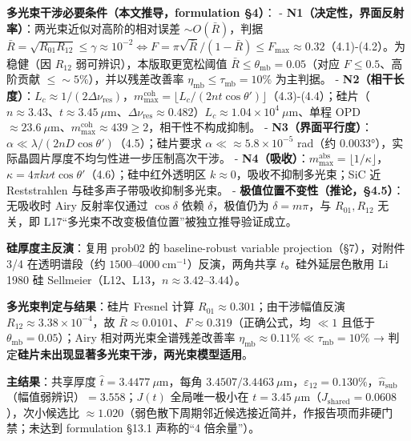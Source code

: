\textbf{多光束干涉必要条件（本文推导，formulation §4）}： -
\textbf{N1（决定性，界面反射率）}：两光束近似对高阶的相对误差
\(\sim O(\bar R)\)，判据
\(\bar R=\sqrt{R_{01}R_{12}}\le\gamma\approx10^{-2}\iff F=\pi\sqrt{\bar R}/(1-\bar R)\le F_{\max}\approx0.32\)（4.1)-(4.2）。为稳健（因
\(R_{12}\) 弱可辨识），本版取更宽松阈值
\(\bar R\le\theta_{\mathrm{mb}}=0.05\)（对应 \(F\le0.5\)、高阶贡献
\(\le\sim5\%\)），并以残差改善率
\(\eta_{\mathrm{mb}}\le\tau_{\mathrm{mb}}=10\%\) 为主判据。 -
\textbf{N2（相干长度）}：\(L_c\approx1/(2\Delta\nu_{\mathrm{res}})\)，\(m_{\max}^{\mathrm{coh}}=\lfloor L_c/(2nt\cos\theta')\rfloor\)（4.3)-(4.4）；硅片（\(n\approx3.43\)、\(t\approx3.45\ \mu\mathrm{m}\)、\(\Delta\nu_{\mathrm{res}}\approx0.482\)）\(L_c\approx1.04\times10^4\ \mu\mathrm{m}\)、单程
OPD\(\approx23.6\ \mu\mathrm{m}\)、\(m_{\max}^{\mathrm{coh}}\approx439\ge2\)，相干性不构成抑制。
-
\textbf{N3（界面平行度）}：\(\alpha\ll\lambda/(2nD\cos\theta')\)（4.5）；硅片要求
\(\alpha\ll\approx5.8\times10^{-5}\) rad（约
\(0.0033°\)），实际晶圆片厚度不均匀性进一步压制高次干涉。 -
\textbf{N4（吸收）}：\(m_{\max}^{\mathrm{abs}}=\lfloor1/\kappa\rfloor\)，\(\kappa=4\pi k\nu t\cos\theta'\)（4.6）；硅中红外透明区
\(k\approx0\)，吸收不抑制多光束；SiC 近 Reststrahlen
与硅多声子带吸收抑制多光束。 -
\textbf{极值位置不变性（推论，§4.5）}：无吸收时 Airy 反射率仅通过
\(\cos\delta\) 依赖 \(\delta\)，极值仍为 \(\delta=m\pi\)，与
\(R_{01},R_{12}\) 无关，即
L17``多光束不改变极值位置''被独立推导验证成立。

\textbf{硅厚度主反演}：复用 prob02 的 baseline-robust variable
projection（§7），对附件 3/4 在透明谱段（约
\(1500\)--\(4000\ \mathrm{cm}^{-1}\)）反演，两角共享
\(t\)。硅外延层色散用 Li 1980 硅
Sellmeier（L12、L13，\(n\approx3.42\)--\(3.44\)）。

\textbf{多光束判定与结果}：硅片 Fresnel 计算
\(R_{01}\approx0.301\)；由干涉幅值反演
\(R_{12}\approx3.38\times10^{-4}\)，故
\(\bar R\approx0.0101\)、\(F\approx0.319\)（正确公式，均 \(\ll1\) 且低于
\(\theta_{\mathrm{mb}}=0.05\)）；Airy 相对两光束全谱残差改善率
\(\eta_{\mathrm{mb}}\approx0.11\%\ll\tau_{\mathrm{mb}}=10\%\) →
判定\textbf{硅片未出现显著多光束干涉，两光束模型适用}。

\textbf{主结果}：共享厚度 \(\hat t=3.4477\ \mu\mathrm{m}\)，每角
\(3.4507/3.4463\ \mu\mathrm{m}\)，\(\varepsilon_{12}=0.130\%\)，\(\hat n_{\mathrm{sub}}\)（幅值弱辨识）\(=3.558\)；\(J(t)\)
全局唯一极小在
\(t=3.45\ \mu\mathrm{m}\)（\(J_{\mathrm{shared}}=0.0608\)），次小候选比
\(\approx1.020\)（弱色散下周期邻近候选接近简并，作报告项而非硬门禁；未达到
formulation §13.1 声称的``4 倍余量''）。

